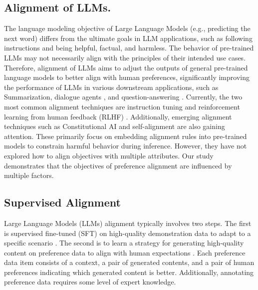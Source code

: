 \subsection{Alignment of LLMs.}
The language modeling objective of Large Language Models (e.g., predicting the next word) differs from the ultimate goals in LLM applications, such as following instructions and being helpful, factual, and harmless\cite{qi2023fine,bhardwaj2024language,yi2024vulnerability}.
The behavior of pre-trained LLMs may not necessarily align with the principles of their intended use cases. 
Therefore, alignment of LLMs \cite{zhu2024lire,wang2024arithmetic} aims to adjust the outputs of general pre-trained language models to better align with human preferences, significantly improving the performance of LLMs in various downstream applications, such as Summarization\cite{hu2024moments}, dialogue agents \cite{niu2024enhancing}, and question-answering \cite{panda2024holmes}.
Currently, the two most common alignment techniques are instruction tuning \cite{ren2024learning} and reinforcement learning from human feedback (RLHF) \cite{bai2022constitutional,ouyang2022training}. 
Additionally, emerging alignment techniques such as Constitutional AI \cite{bai2022constitutional} and self-alignment \cite{ren2024learning} are also gaining attention.
These primarily focus on embedding alignment rules into pre-trained models to constrain harmful behavior during inference. However, they have not explored how to align objectives with multiple attributes. 
Our study demonstrates that the objectives of preference alignment are influenced by multiple factors.

\subsection{Supervised Alignment}
Large Language Models (LLMs) alignment typically involves two steps. 
The first is supervised fine-tuned (SFT) on high-quality demonstration data to adapt to a specific scenario \cite{stiennon2020learning}.
The second is to learn a strategy for generating high-quality content on preference data to align with human expectations \cite{azar2024general}.
Each preference data item consists of a context, a pair of generated contents, and a pair of human preferences indicating which generated content is better. Additionally, annotating preference data requires some level of expert knowledge.


